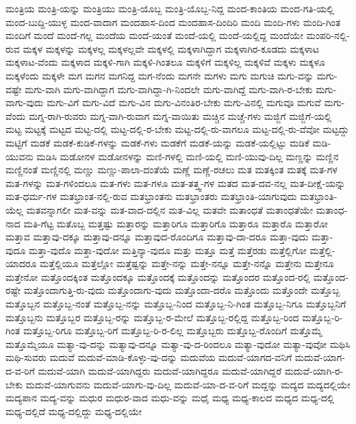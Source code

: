 {ಮಂತ್ರಿಯ
ಮಂತ್ರಿ-ಯನ್ನು
ಮಂತ್ರಿಯು
ಮಂತ್ರಿ-ಯೊಬ್ಬ
ಮಂತ್ರಿ-ಯೊಬ್ಬ-ನಿದ್ದ
ಮಂದ-ಕಾಂತಿಯ
ಮಂದ-ಗತಿ-ಯಲ್ಲಿ
ಮಂದ-ಬುದ್ದಿ-ಯುಳ್ಳ
ಮಂದ-ವಾದಾಗ
ಮಂದಹಾಸ-ದಿಂದ
ಮಂದಹಾಸ-ದಿಂದಿರಿ
ಮಂದಿ
ಮಂದಿ-ಗಳು
ಮಂದಿ-ಗಿಂತ
ಮಂದಿಗೆ
ಮಂದೆ
ಮಂದೆ-ಗಲ್ಲ
ಮಂದೆಯ
ಮಂದೆ-ಯಂತೆ
ಮಂದೆ-ಯಲ್ಲಿ
ಮಂದೆ-ಯಲ್ಲಿದ್ದ
ಮಂದೆಯೇ
ಮಂಪರಿ-ನಲ್ಲಿ-ರುವ
ಮಕ್ಕಳ
ಮಕ್ಕಳನ್ನು
ಮಕ್ಕಳಲ್ಲ
ಮಕ್ಕಳಲ್ಲವೇ
ಮಕ್ಕಳಲ್ಲಿ
ಮಕ್ಕಳಾಗಿದ್ದಾಗ
ಮಕ್ಕಳಾಗಿರ-ಕೂಡದು
ಮಕ್ಕಳಾಟ
ಮಕ್ಕಳಾಟ-ವೆಂದು
ಮಕ್ಕಳಾದ
ಮಕ್ಕಳಿ-ಗಾಗಿ
ಮಕ್ಕಳಿ-ಗಿಂತಲೂ
ಮಕ್ಕಳಿಗೆ
ಮಕ್ಕಳಿಲ್ಲ
ಮಕ್ಕಳಿವೆ
ಮಕ್ಕಳು
ಮಕ್ಕಳೂ
ಮಕ್ಕಳೆಂದು
ಮಕ್ಕಳೇ
ಮಗ
ಮಗನ
ಮಗನಿದ್ದ
ಮಗ-ನೆಂದು
ಮಗನೇ
ಮಗಳು
ಮಗು
ಮಗುಚಿ
ಮಗು-ವನ್ನು
ಮಗು-ವಷ್ಟೇ
ಮಗು-ವಾಗಿ
ಮಗು-ವಾಗಿದ್ದಾಗ
ಮಗು-ವಾಗಿದ್ದಾ-ಗಿ-ನಿಂದಲೇ
ಮಗು-ವಾಗಿದ್ದೆ
ಮಗು-ವಾಗಿ-ರ-ಬೇಕು
ಮಗು-ವಾಗು-ವುದು
ಮಗು-ವಿಗೆ
ಮಗು-ವಿದೆ
ಮಗು-ವಿನ
ಮಗು-ವಿನಂತಿರ-ಬೇಕು
ಮಗು-ವಿನಲ್ಲಿ
ಮಗುವೂ
ಮಗುವೆ
ಮಗು-ವೆಂದು
ಮಗ್ನ-ರಾಗಿ-ರುವರು
ಮಗ್ನ-ವಾಗಿ-ರುವಾಗ
ಮಗ್ನ-ವಾಯಿತು
ಮಚ್ಚಿನ
ಮಚ್ಚೆ-ಗಳು
ಮಜ್ಜಿಗೆ
ಮಜ್ಜಿಗೆ-ಯಲ್ಲಿ
ಮಟ್ಟ
ಮಟ್ಟಕ್ಕೆ
ಮಟ್ಟದ
ಮಟ್ಟ-ದಲ್ಲಿ
ಮಟ್ಟ-ದಲ್ಲಿ-ರ-ಬೇಕು
ಮಟ್ಟ-ದಲ್ಲಿ-ರು-ವಾಗಲೂ
ಮಟ್ಟ-ದಲ್ಲಿ-ರು-ವೆವೋ
ಮಟ್ಟದ್ದು
ಮಟ್ಟಿಗೆ
ಮಡಕೆ
ಮಡಕೆ-ಕುಡಿಕೆ-ಗಳನ್ನು
ಮಡಕೆ-ಗಳು
ಮಡಕೆಗೆ
ಮಡಕೆ-ಯನ್ನು
ಮಡಕೆ-ಯಲ್ಲಿಟ್ಟು
ಮಡಿಕೆ
ಮಡಿ-ಯುವನು
ಮಡಿಸಿ
ಮಡೋನಳ
ಮಡೋನಳನ್ನು
ಮಣಿ-ಗಳಲ್ಲಿ
ಮಣಿ-ಯಲ್ಲಿ
ಮಣಿ-ಯುವು-ದಿಲ್ಲ
ಮಣ್ಣನ್ನು
ಮಣ್ಣಿನ
ಮಣ್ಣಿನಂತೆ
ಮಣ್ಣಿನಲ್ಲಿ
ಮಣ್ಣು
ಮಣ್ಣು-ಪಾಲಾ-ದಂತೆಯೆ
ಮಣ್ಣೆ
ಮಣ್ಣೆ-ರಚಲು
ಮತ
ಮತಕ್ಕಿಂತ
ಮತಕ್ಕೆ
ಮತ-ಗಳ
ಮತ-ಗಳನ್ನು
ಮತ-ಗಳಿಂದಲೂ
ಮತ-ಗಳು
ಮತ-ಗಳೂ
ಮತ-ತತ್ತ್ವ-ಗಳ
ಮತದ
ಮತ-ದವ-ನಲ್ಲ
ಮತ-ದೀಕ್ಷೆ-ಯನ್ನು
ಮತ-ಧರ್ಮ-ಗಳ
ಮತಭ್ರಾಂತ-ನಲ್ಲಿ-ರುವ
ಮತಭ್ರಾಂತನು
ಮತಭ್ರಾಂತರು
ಮತಭ್ರಾಂತಿ-ಯಾಗುವುದು
ಮತಭ್ರಾಂತಿ-ಯೆಲ್ಲ
ಮತವನ್ನಾಗಲೀ
ಮತ-ವನ್ನು
ಮತ-ವಾದ-ದಲ್ಲಿನ
ಮತ-ವಿಲ್ಲ
ಮತವೇ
ಮತಾಂಧತೆ
ಮತಾಂಧತೆಯೇ
ಮತಾಂಧ-ನಾದ
ಮತಿ-ಗೆಟ್ಟ
ಮತೊಬ್ಬ
ಮತ್ತಷ್ಟು
ಮತ್ತಾರನ್ನು
ಮತ್ತಾರಿಗೂ
ಮತ್ತಾರಿಗೊ
ಮತ್ತಾರೂ
ಮತ್ತಾರೊ
ಮತ್ತಾರೋ
ಮತ್ತಾವ
ಮತ್ತಾವು-ದಕ್ಕೂ
ಮತ್ತಾವು-ದನ್ನೂ
ಮತ್ತಾವುದ-ರೊಂದಿಗೂ
ಮತ್ತಾವು-ದಾ-ದರೂ
ಮತ್ತಾ-ವುದು
ಮತ್ತಾ-ವುದೂ
ಮತ್ತಾ-ವುದೊ
ಮತ್ತಾ-ವುದೋ
ಮತ್ತಿನ್ಯಾ-ವುದೂ
ಮತ್ತು
ಮತ್ತೂ
ಮತ್ತೆ
ಮತ್ತೆರಡು
ಮತ್ತೆಲ್ಲಿಗೋ
ಮತ್ತೆಲ್ಲಿ-ಯಾದರೂ
ಮತ್ತೆಲ್ಲಿಯೂ
ಮತ್ತೆಲ್ಲೋ
ಮತ್ತೆಷ್ಟನ್ನು
ಮತ್ತೇ-ನನ್ನು
ಮತ್ತೇ-ನನ್ನೂ
ಮತ್ತೇ-ನನ್ನೊ
ಮತ್ತೇನು
ಮತ್ತೇನೂ
ಮತ್ತೇನೋ
ಮತ್ತೊಂದಕ್ಕಿಂತ
ಮತ್ತೊಂದಕ್ಕೂ
ಮತ್ತೊಂದಕ್ಕೆ
ಮತ್ತೊಂದನ್ನು
ಮತ್ತೊಂದರ
ಮತ್ತೊಂದ-ರಲ್ಲಿ
ಮತ್ತೊಂದ-ರಷ್ಟೇ
ಮತ್ತೊಂದಾಗುತ್ತಿ-ರು-ವುದು
ಮತ್ತೊಂದಾಗು-ವುದು
ಮತ್ತೊಂದಾ-ದರೊ
ಮತ್ತೊಂದು
ಮತ್ತೊಂದೇ
ಮತ್ತೊಬ್ಬ
ಮತ್ತೊಬ್ಬನ
ಮತ್ತೊಬ್ಬ-ನಂತೆ
ಮತ್ತೊಬ್ಬ-ನನ್ನು
ಮತ್ತೊಬ್ಬ-ನಿಂದ
ಮತ್ತೊಬ್ಬ-ನಿ-ಗಿಂತ
ಮತ್ತೊಬ್ಬ-ನಿಗೂ
ಮತ್ತೊಬ್ಬನಿಗೆ
ಮತ್ತೊಬ್ಬನು
ಮತ್ತೊಬ್ಬರ
ಮತ್ತೊಬ್ಬ-ರನ್ನು
ಮತ್ತೊಬ್ಬ-ರ-ಮೇಲೆ
ಮತ್ತೊಬ್ಬ-ರಲ್ಲಿದ್ದ
ಮತ್ತೊಬ್ಬ-ರಿಂದ
ಮತ್ತೊಬ್ಬ-ರಿ-ಗಿಂತ
ಮತ್ತೊಬ್ಬ-ರಿಗೂ
ಮತ್ತೊಬ್ಬ-ರಿಗೆ
ಮತ್ತೊಬ್ಬ-ರಿ-ರ-ಲಿಲ್ಲ
ಮತ್ತೊಬ್ಬರು
ಮತ್ತೊಬ್ಬ-ರೊಂದಿಗೆ
ಮತ್ತೊಮ್ಮೆ
ಮತ್ತೊಮ್ಮೆಯೂ
ಮತ್ಯಾ-ವು-ದನ್ನು
ಮತ್ಯಾವು-ದನ್ನೂ
ಮತ್ಯಾ-ವು-ದ-ರಿಂದಲೂ
ಮತ್ಯಾ-ವುದೋ
ಮತ್ಯಾ-ವುವೋ
ಮಥಿಸಿ
ಮಥಿ-ಸುವರು
ಮದುವೆ
ಮದುವೆ-ಮಾಡಿ-ಕೊಳ್ಳು-ವು-ದನ್ನು
ಮದುವೆಯ
ಮದುವೆ-ಯಾಗದ-ವನಿಗೆ
ಮದುವೆ-ಯಾಗ-ದ-ವ-ರಿಗೆ
ಮದುವೆ-ಯಾಗಿ
ಮದುವೆ-ಯಾಗಿದ್ದರು
ಮದುವೆ-ಯಾಗಿದ್ದರೂ
ಮದುವೆ-ಯಾಗಿದ್ದರೆ
ಮದುವೆ-ಯಾಗಿ-ರ-ಬೇಕು
ಮದುವೆ-ಯಾಗುವನು
ಮದುವೆ-ಯಾಗು-ವು-ದಿಲ್ಲ
ಮದುವೆ-ಯಾ-ದ-ವ-ರಿಗೆ
ಮದ್ದನ್ನು
ಮದ್ಯದ
ಮದ್ಯದಲ್ಲಿಯೇ
ಮದ್ಯಪಾನ
ಮದ್ಯ-ವನ್ನು
ಮಧುರ
ಮಧುರ-ವಾದ
ಮಧು-ವನ್ನು
ಮಧೈ
ಮಧ್ಯ
ಮಧ್ಯ-ಕಾಲದ
ಮಧ್ಯದ
ಮಧ್ಯ-ದಲ್ಲಿ
ಮಧ್ಯ-ದಲ್ಲಿದೆ
ಮಧ್ಯ-ದಲ್ಲಿದ್ದು
ಮಧ್ಯ-ದಲ್ಲಿಯೇ
}
